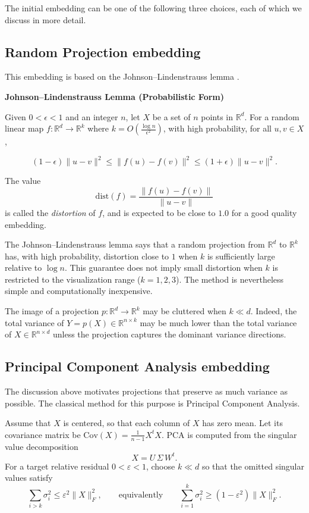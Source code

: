 \documentclass[11pt]{article}
\begin{document}
The initial embedding can be one of the following three choices, each of which we discuss in more detail.

\subsection{Random Projection embedding} This embedding is based on the Johnson--Lindenstrauss lemma \cite{JL}.

\medskip

\textbf{Johnson--Lindenstrauss Lemma (Probabilistic Form)}

Given \(0 < \epsilon < 1\) and an integer \(n\), let \(X\) be a set of \(n\) points in \(\mathbb{R}^d\). For a random linear map \(f: \mathbb{R}^d \to \mathbb{R}^k\) where \(k = O\left(\frac{\log n}{\epsilon^2}\right)\), with high probability, for all \(u, v \in X\),

\[
(1 - \epsilon) \|u - v\|^2 \leq \|f(u) - f(v)\|^2 \leq (1 + \epsilon) \|u - v\|^2.
\]

The value \[\text{dist}(f) = \frac{\|f(u) - f(v)\|}{\|u - v\|}\] is called the \textit{distortion} of $f$, and is expected to be close to $1.0$ for a good quality embedding. 

The Johnson--Lindenstrauss lemma says that a random projection from $\mathbb{R}^d$ to $\mathbb{R}^k$ has, with high probability, distortion close to $1$ when $k$ is sufficiently large relative to $\log n$. This guarantee does not imply small distortion when $k$ is restricted to the visualization range ($k=1, 2, 3$). The method is nevertheless simple and computationally inexpensive.

The image of a projection $p: \mathbb{R}^d \rightarrow \mathbb{R}^k$ may be cluttered when $k \ll d$. Indeed, the total variance of $Y = p(X) \in \mathbb{R}^{n\times k}$ may be much lower than the total variance of $X \in \mathbb{R}^{n\times d}$ unless the projection captures the dominant variance directions.

\subsection{Principal Component Analysis embedding}

The discussion above motivates projections that preserve as much variance as possible. The classical method for this purpose is Principal Component Analysis.

Assume that $X$ is centered, so that each column of $X$ has zero mean. Let its covariance matrix be $\text{Cov}(X) = \frac{1}{n-1} X^t X$. PCA is computed from the singular value decomposition
\[ X = U \, \Sigma \, W^t. \]
For a target relative residual $0<\varepsilon<1$, choose $k\ll d$ so
that the omitted singular values satisfy
\[
  \sum_{i>k}\sigma_i^2\leq\varepsilon^2\|X\|_F^2,
  \qquad\text{equivalently}\qquad
  \sum_{i=1}^k\sigma_i^2\geq(1-\varepsilon^2)\|X\|_F^2.
\]
\end{document}
